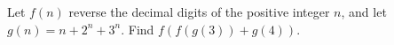 Let $f(n)$ reverse the decimal digits of the positive integer $n$, and let $g(n)=n+2^n+3^n$. Find $f(f(g(3))+g(4))$.
